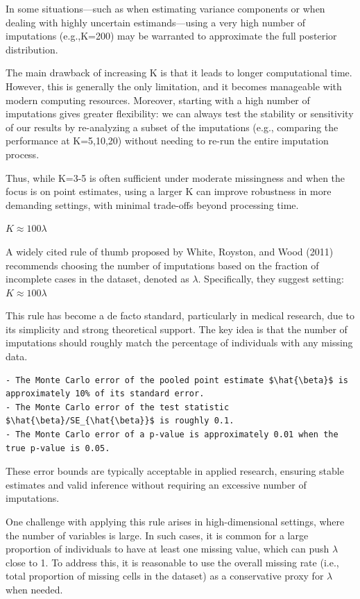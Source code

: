 \documentclass{article}
\begin{document}
In some situations---such as when estimating variance components or when
dealing with highly uncertain estimands---using a very high number of
imputations (e.g.,K=200) may be warranted to approximate the full
posterior distribution.

The main drawback of increasing K is that it leads to longer
computational time. However, this is generally the only limitation, and
it becomes manageable with modern computing resources. Moreover,
starting with a high number of imputations gives greater flexibility: we
can always test the stability or sensitivity of our results by
re-analyzing a subset of the imputations (e.g., comparing the
performance at K=5,10,20) without needing to re-run the entire
imputation process.

Thus, while K=3-5 is often sufficient under moderate missingness and
when the focus is on point estimates, using a larger K can improve
robustness in more demanding settings, with minimal trade-offs beyond
processing time.

\textbf{\(K \approx 100\lambda\)}

A widely cited rule of thumb proposed by White, Royston, and Wood (2011)
recommends choosing the number of imputations based on the fraction of
incomplete cases in the dataset, denoted as \(\lambda\). Specifically,
they suggest setting:\(K \approx 100\lambda\)

This rule has become a de facto standard, particularly in medical
research, due to its simplicity and strong theoretical support. The key
idea is that the number of imputations should roughly match the
percentage of individuals with any missing data.

\begin{verbatim}
- The Monte Carlo error of the pooled point estimate $\hat{\beta}$ is approximately 10% of its standard error.
- The Monte Carlo error of the test statistic $\hat{\beta}/SE_{\hat{\beta}}$ is roughly 0.1.
- The Monte Carlo error of a p-value is approximately 0.01 when the true p-value is 0.05.
\end{verbatim}

These error bounds are typically acceptable in applied research,
ensuring stable estimates and valid inference without requiring an
excessive number of imputations.

One challenge with applying this rule arises in high-dimensional
settings, where the number of variables is large. In such cases, it is
common for a large proportion of individuals to have at least one
missing value, which can push \(\lambda\) close to 1. To address this,
it is reasonable to use the overall missing rate (i.e., total proportion
of missing cells in the dataset) as a conservative proxy for \(\lambda\)
when needed.
\end{document}
